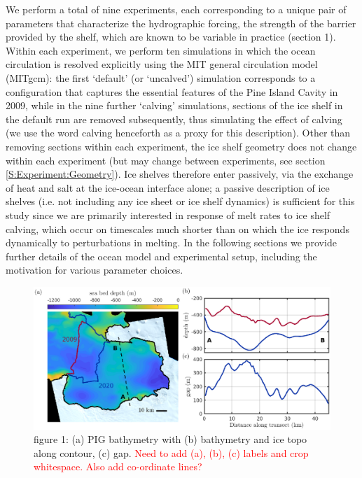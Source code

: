 \documentclass[draft]{agujournal2019}
\newcommand{\red}[1]{\textcolor{red}{#1}}
\begin{document}
We perform a total of nine experiments, each corresponding to a unique pair of parameters that characterize the hydrographic forcing, the strength of the barrier provided by the shelf, which are known to be variable in practice (section 1). Within each experiment, we perform ten simulations in which the ocean circulation is resolved explicitly using the MIT general circulation model (MITgcm): the first `default' (or `uncalved') simulation  corresponds to a configuration that captures the essential features of the Pine Island Cavity in 2009, while in the nine further `calving' simulations, sections of the ice shelf in the default run are removed subsequently, thus simulating the effect of calving (we use the word calving henceforth as a proxy for this description). Other than removing sections within each experiment, the ice shelf geometry does not change within each experiment (but may change between experiments, see section \ref{S:Experiment:Geometry}). Ice shelves therefore enter passively, via the exchange of heat and salt at the ice-ocean interface alone; a passive description of ice shelves (i.e. not including any ice sheet or ice shelf dynamics) is sufficient for this study since we are primarily interested in response of melt rates to ice shelf calving, which occur on timescales much shorter than on which the ice responds dynamically to perturbations in melting. In the following sections we provide further details of the ocean model and experimental setup, including the motivation for various parameter choices.
\begin{figure}
    \centering
    \includegraphics[width = \textwidth]{../make_figures/plots/figure1.eps}
    \caption{figure 1: (a) PIG bathymetry with (b) bathymetry and ice topo along contour, (c) gap. \red{Need to add (a), (b), (c) labels and crop whitespace. Also add co-ordinate lines?}}
    \label{fig:figure1}
\end{figure}
\end{document}
